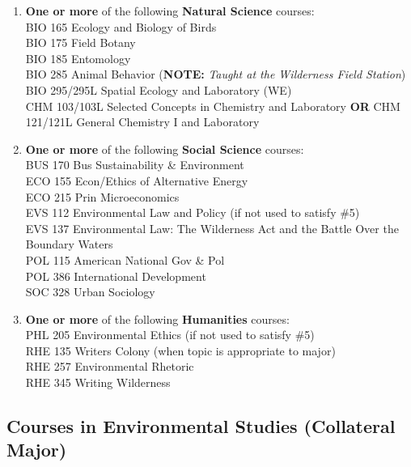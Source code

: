 \documentclass[
  letterpaper,
]{scrbook}
\providecommand{\tightlist}{%
  \setlength{\itemsep}{0pt}\setlength{\parskip}{0pt}}
\begin{document}
\begin{enumerate}
  \begin{enumerate}
  \def\labelenumii{\alph{enumii}.}
  \tightlist
  \item
    \textbf{One or more} of the following \textbf{Natural Science}
    courses:\\
    BIO 165 Ecology and Biology of Birds\\
    BIO 175 Field Botany\\
    BIO 185 Entomology\\
    BIO 285 Animal Behavior (\textbf{NOTE:} \emph{Taught at the
    Wilderness Field Station})\\
    BIO 295/295L Spatial Ecology and Laboratory (WE)\\
    CHM 103/103L Selected Concepts in Chemistry and Laboratory
    \textbf{OR} CHM 121/121L General Chemistry I and Laboratory\\
  \item
    \textbf{One or more} of the following \textbf{Social Science}
    courses:\\
    BUS 170 Bus Sustainability \& Environment\\
    ECO 155 Econ/Ethics of Alternative Energy\\
    ECO 215 Prin Microeconomics\\
    EVS 112 Environmental Law and Policy (if not used to satisfy \#5)\\
    EVS 137 Environmental Law: The Wilderness Act and the Battle Over
    the Boundary Waters\\
    POL 115 American National Gov \& Pol\\
    POL 386 International Development\\
    SOC 328 Urban Sociology\\
  \item
    \textbf{One or more} of the following \textbf{Humanities} courses:\\
    PHL 205 Environmental Ethics (if not used to satisfy \#5)\\
    RHE 135 Writers Colony (when topic is appropriate to major)\\
    RHE 257 Environmental Rhetoric\\
    RHE 345 Writing Wilderness
  \end{enumerate}
\end{enumerate}

\subsection{Courses in Environmental Studies (Collateral
Major)}\label{courses-in-environmental-studies-collateral-major}
\end{document}

